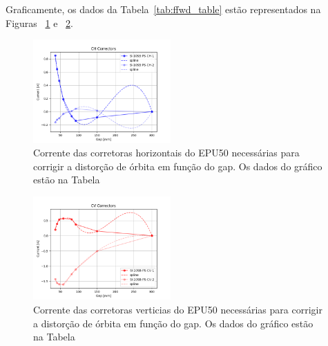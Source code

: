 \documentclass[a4paper,
               keeplastbox,   %
               ]{jacow}
\begin{document}
Graficamente, os dados da Tabela~\ref{tab:ffwd_table} estão representados na Figuras ~\ref{fig:ffwd_table_h} e ~\ref{fig:ffwd_table_v}.
\begin{figure}
    \centering
    \includegraphics[width=0.47\textwidth]{idff_horizontal.png}
    \caption{Corrente das corretoras horizontais do EPU50 necessárias para corrigir a distorção de órbita em função do gap. Os dados do gráfico estão na Tabela}
    \label{fig:ffwd_table_h}
\end{figure}
\begin{figure}
    \centering
    \includegraphics[width=0.47\textwidth]{idff_vertical.png}
    \caption{Corrente das corretoras verticias do EPU50 necessárias para corrigir a distorção de órbita em função do gap. Os dados do gráfico estão na Tabela}
    \label{fig:ffwd_table_v}
\end{figure}
\end{document}
